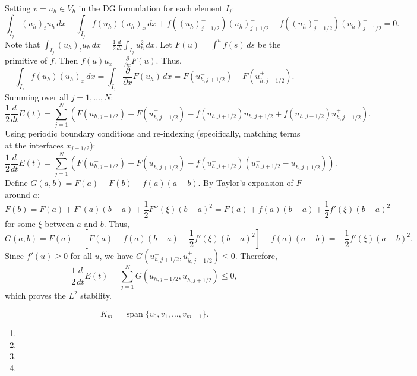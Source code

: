 \begin{solution}
Setting $v = u_h \in V_h$ in the DG formulation for each element $I_j$:
\[
\int_{I_{j}}(u_{h})_{t} u_h \,dx - \int_{I_{j}} f(u_{h}) (u_h)_x \,dx + f((u_{h})_{j+1/2}^{-}) (u_h)_{j+1/2}^{-} - f((u_{h})_{j-1/2}^{-}) (u_h)_{j-1/2}^{+} = 0.
\]
Note that $\int_{I_{j}} (u_h)_t u_h \, dx = \frac{1}{2} \frac{d}{dt} \int_{I_j} u_h^2 \, dx$. Let $F(u) = \int^u f(s) \, ds$ be the primitive of $f$. Then $f(u) u_x = \frac{\partial}{\partial x} F(u)$. Thus,
\[
\int_{I_j} f(u_h) (u_h)_x \, dx = \int_{I_j} \frac{\partial}{\partial x} F(u_h) \, dx = F(u_{h, j+1/2}^-) - F(u_{h, j-1/2}^+).
\]
Summing over all $j=1, \dots, N$:
\[
\frac{1}{2} \frac{d}{dt} E(t) = \sum_{j=1}^N \left( F(u_{h, j+1/2}^-) - F(u_{h, j-1/2}^+) - f(u_{h, j+1/2}^-) u_{h, j+1/2}^- + f(u_{h, j-1/2}^-) u_{h, j-1/2}^+ \right).
\]
Using periodic boundary conditions and re-indexing (specifically, matching terms at the interfaces $x_{j+1/2}$):
\[
\frac{1}{2} \frac{d}{dt} E(t) = \sum_{j=1}^N \left( F(u_{h, j+1/2}^-) - F(u_{h, j+1/2}^+) - f(u_{h, j+1/2}^-) (u_{h, j+1/2}^- - u_{h, j+1/2}^+) \right).
\]
Define $G(a, b) = F(a) - F(b) - f(a)(a-b)$. By Taylor's expansion of $F$ around $a$:
\[
F(b) = F(a) + F'(a)(b-a) + \frac{1}{2} F''(\xi)(b-a)^2 = F(a) + f(a)(b-a) + \frac{1}{2} f'(\xi)(b-a)^2
\]
for some $\xi$ between $a$ and $b$. Thus,
\[
G(a, b) = F(a) - [F(a) + f(a)(b-a) + \frac{1}{2} f'(\xi)(b-a)^2] - f(a)(a-b) = -\frac{1}{2} f'(\xi)(a-b)^2.
\]
Since $f'(u) \geq 0$ for all $u$, we have $G(u_{h, j+1/2}^-, u_{h, j+1/2}^+) \leq 0$. Therefore,
\[
\frac{1}{2} \frac{d}{dt} E(t) = \sum_{j=1}^N G(u_{h, j+1/2}^-, u_{h, j+1/2}^+) \leq 0,
\]
which proves the $L^2$ stability.
\end{solution}

\begin{exercise}
\label{applied:2014:4}
\[
K_{m}=\operatorname{span}\{v_{0},v_{1},\dots,v_{m-1}\}.
\]

\begin{enumerate}
\item[(i)] %
\item[(ii)] %
\item[(iii)] %
\item[(iv)] %
\end{enumerate}
\end{exercise}

